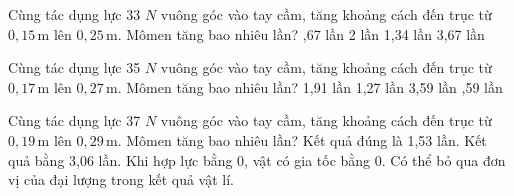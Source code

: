 \begin{ex}
Cùng tác dụng lực 33 $N$ vuông góc vào tay cầm, tăng khoảng cách đến trục từ $0,15\,\text{m}$ lên $0,25\,\text{m}$. Mômen tăng bao nhiêu lần?
\choice
{,67 lần}
{2 lần}
{1,34 lần}
{3,67 lần}
\end{ex}

\begin{ex}
Cùng tác dụng lực 35 $N$ vuông góc vào tay cầm, tăng khoảng cách đến trục từ $0,17\,\text{m}$ lên $0,27\,\text{m}$. Mômen tăng bao nhiêu lần?
\choice
{1,91 lần}
{1,27 lần}
{3,59 lần}
{,59 lần}
\end{ex}

\begin{ex}
Cùng tác dụng lực 37 $N$ vuông góc vào tay cầm, tăng khoảng cách đến trục từ $0,19\,\text{m}$ lên $0,29\,\text{m}$. Mômen tăng bao nhiêu lần?
\choiceTF
{\True Kết quả đúng là 1,53 lần.}
{Kết quả bằng 3,06 lần.}
{\True Khi hợp lực bằng 0, vật có gia tốc bằng 0.}
{Có thể bỏ qua đơn vị của đại lượng trong kết quả vật lí.}
\end{ex}

